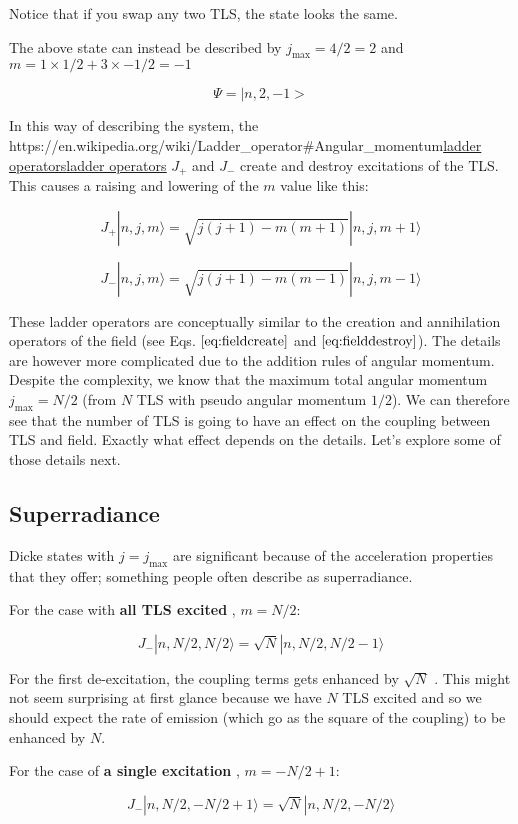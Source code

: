 \documentclass[
]{article}
\let\oldhref\href
\renewcommand{\href}[2]{\ifx#1\urlprefix\oldhref{#1}{#2}\else\uline{\oldhref{#1}{#2}}\fi}
\renewcommand{\[}{\begin{equation}}
\renewcommand{\]}{\end{equation}}
\begin{document}
Notice that if you swap any two TLS, the state looks the same.

The above state can instead be described by \(j_{\max}= 4/2  = 2\) and
\(m = 1\times 1/2 + 3\times -1/2 =-1\)

\[
\Psi = |n,2,-1>
\]

In this way of describing the system, the
\href{https://en.wikipedia.org/wiki/Ladder_operator\#Angular_momentum}{ladder
operators} \(J_{+}\) and \(J_{-}\) create and destroy excitations of the
TLS. This causes a raising and lowering of the \(m\) value like this:

\[
J_+ |n, j, m\rangle  =  \sqrt{j(j + 1) - m(m + 1)} |n, j, m + 1\rangle
\]

\[
J_- |n, j, m\rangle =  \sqrt{j(j + 1) - m(m - 1)} |n, j, m - 1\rangle
\]

These ladder operators are conceptually similar to the creation and
annihilation operators of the field (see Eqs. \(\ref{eq:fieldcreate}\)
and \(\ref{eq:fielddestroy}\)). The details are however more complicated
due to the addition rules of angular momentum. Despite the complexity,
we know that the maximum total angular momentum \(j_{\max} = N/2\) (from
\(N\) TLS with pseudo angular momentum \(1/2\)). We can therefore see
that the number of TLS is going to have an effect on the coupling
between TLS and field. Exactly what effect depends on the details. Let's
explore some of those details next.

\subsection{Superradiance}\label{superradiance}

Dicke states with \(j=j_{\max}\) are significant because of the
acceleration properties that they offer; something people often describe
as superradiance.

For the case with \textbf{all TLS excited} , \(m=N/2\):

\[
J_- |n, N/2, N/2\rangle  = \sqrt{N} |n, N/2, N/2 - 1\rangle
\]

For the first de-excitation, the coupling terms gets enhanced by
\(\sqrt{N}\) . This might not seem surprising at first glance because we
have \(N\) TLS excited and so we should expect the rate of emission
(which go as the square of the coupling) to be enhanced by \(N\).

For the case of \textbf{a single excitation} , \(m=-N/2 + 1\):

\[
J_- |n, N/2, -N/2 +1\rangle  = \sqrt{N}|n, N/2, -N/2\rangle
\]
\end{document}
